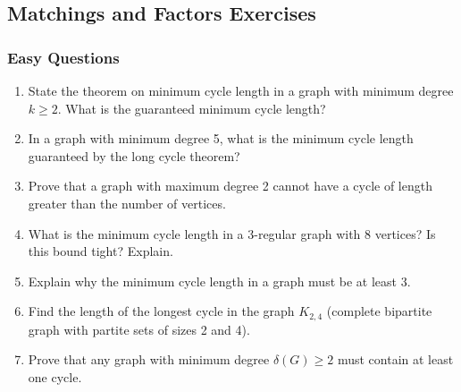 \documentclass{article}
\theoremstyle{definition}
\begin{document}
\subsection{Matchings and Factors Exercises}

\subsubsection{Easy Questions}
\begin{enumerate}
\item State the theorem on minimum cycle length in a graph with minimum degree $k \geq 2$. What is the guaranteed minimum cycle length?

\item In a graph with minimum degree 5, what is the minimum cycle length guaranteed by the long cycle theorem?

\item Prove that a graph with maximum degree 2 cannot have a cycle of length greater than the number of vertices.

\item What is the minimum cycle length in a 3-regular graph with 8 vertices? Is this bound tight? Explain.

\item Explain why the minimum cycle length in a graph must be at least 3.

\item Find the length of the longest cycle in the graph $K_{2,4}$ (complete bipartite graph with partite sets of sizes 2 and 4).

\item Prove that any graph with minimum degree $\delta(G) \geq 2$ must contain at least one cycle.
\end{enumerate}
\end{document}
